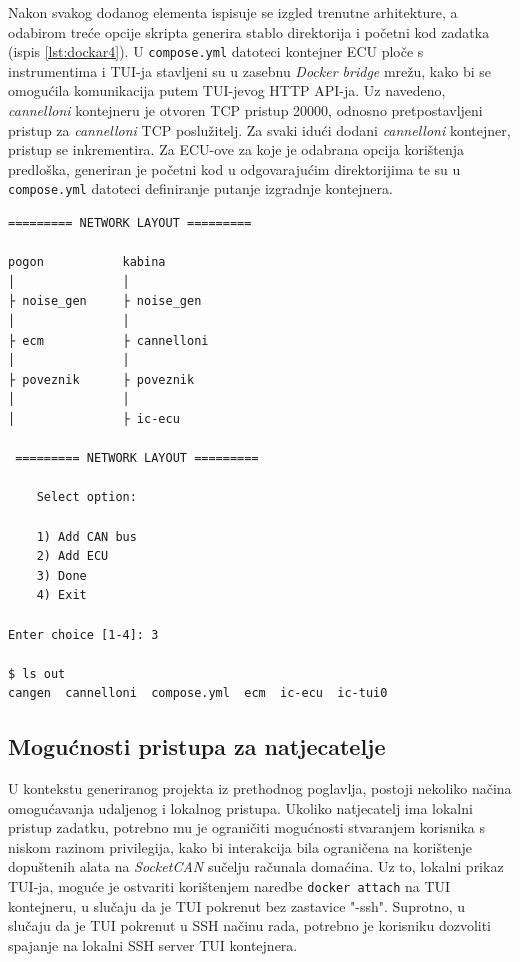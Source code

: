 \documentclass[times, utf8, diplomski, numeric]{fer}
\begin{document}
Nakon svakog dodanog elementa ispisuje se izgled trenutne arhitekture, a odabirom treće opcije skripta generira stablo direktorija i početni kod zadatka (ispis \ref{lst:dockar4}). U \texttt{compose.yml} datoteci kontejner ECU ploče s instrumentima i TUI-ja stavljeni su u zasebnu \textit{Docker bridge} mrežu, kako bi se omogućila komunikacija putem TUI-jevog HTTP API-ja. Uz navedeno, \textit{cannelloni} kontejneru je otvoren TCP pristup 20000, odnosno pretpostavljeni pristup za \textit{cannelloni} TCP poslužitelj. Za svaki idući dodani \textit{cannelloni} kontejner, pristup se inkrementira. Za ECU-ove za koje je odabrana opcija korištenja predloška, generiran je početni kod u odgovarajućim direktorijima te su u \texttt{compose.yml} datoteci definiranje putanje izgradnje kontejnera. 
\bigskip
\begin{lstlisting}[style=terminal, label={lst:dockar4},caption={Završetak postupka generacije projekta}]
 ========= NETWORK LAYOUT =========
 
pogon           kabina          
│               │               
├ noise_gen     ├ noise_gen     
│               │               
├ ecm           ├ cannelloni    
│               │               
├ poveznik      ├ poveznik      
│               │               
│               ├ ic-ecu               

 ========= NETWORK LAYOUT ========= 

    Select option:

    1) Add CAN bus
    2) Add ECU
    3) Done
    4) Exit
    
Enter choice [1-4]: 3

$ ls out
cangen  cannelloni  compose.yml  ecm  ic-ecu  ic-tui0
\end{lstlisting}
\newpage
\subsection{Mogućnosti pristupa za natjecatelje}
U kontekstu generiranog projekta iz prethodnog poglavlja, postoji nekoliko načina omogućavanja udaljenog i lokalnog pristupa. Ukoliko natjecatelj ima lokalni pristup zadatku, potrebno mu je ograničiti mogućnosti stvaranjem korisnika s niskom razinom privilegija, kako bi interakcija bila ograničena na korištenje dopuštenih alata na \textit{SocketCAN} sučelju računala domaćina. Uz to, lokalni prikaz TUI-ja, moguće je ostvariti korištenjem naredbe \texttt{docker attach} na TUI kontejneru, u slučaju da je TUI pokrenut bez zastavice "-ssh". Suprotno, u slučaju da je TUI pokrenut u SSH načinu rada, potrebno je korisniku dozvoliti spajanje na lokalni SSH server TUI kontejnera.
\end{document}
